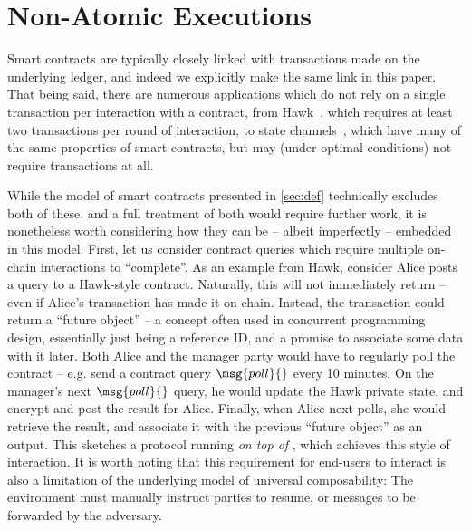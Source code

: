 \section{Non-Atomic Executions}
\label{sec:nonatomic}

Smart contracts are typically closely linked with transactions made on the
underlying ledger, and indeed we explicitly make the same link in this paper.
That being said, there are numerous applications which do not rely on a single
transaction per interaction with a contract, from Hawk~\cite{SP:KMSWP16}, which
requires at least two transactions per round of interaction, to state
channels~\cite{CCS:DziFauHos18}, which have many of the same properties of smart
contracts, but may (under optimal conditions) not require transactions at all.

While the model of smart contracts presented in \autoref{sec:def}
technically excludes both of these, and a full treatment of both would require
further work, it is nonetheless worth considering how they can be -- albeit
imperfectly -- embedded in this model. First, let us consider contract queries
which require multiple on-chain interactions to ``complete''. As an example from
Hawk, consider Alice posts a query to a Hawk-style contract. Naturally, this
will not immediately return -- even if Alice's transaction has made it on-chain.
Instead, the transaction could return a ``future object'' -- a concept often
used in concurrent programming design, essentially just being a reference ID,
and a promise to associate some data with it later. Both Alice and the manager
party would have to regularly poll the contract -- e.g. send a contract query
$\msg{poll}{}$ every 10 minutes. On the manager's next $\msg{poll}{}$ query, he
would update the Hawk private state, and encrypt and post the result for Alice.
Finally, when Alice next polls, she would retrieve the result, and associate it
with the previous ``future object'' as an output. This sketches a protocol
running \emph{on top of \kachina}, which achieves this style of interaction.
It is worth noting that this requirement for end-users to interact is also a
limitation of the underlying model of universal composability: The environment
must manually instruct parties to resume, or messages to be forwarded by the
adversary.


